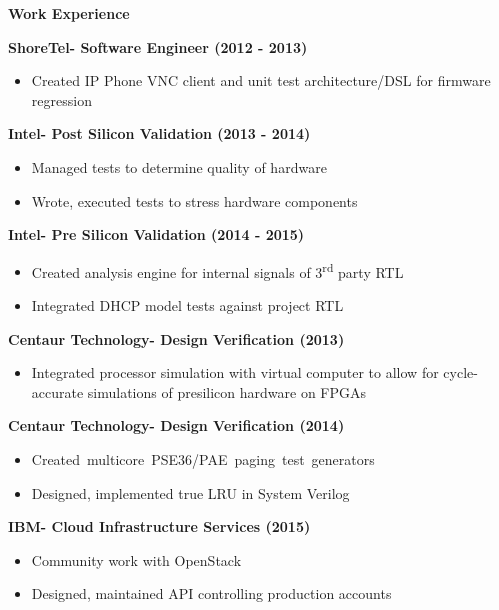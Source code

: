 \documentclass{report}
\begin{document}
\textbf{Work Experience} \\
\begin{paracol}{2}
  \textbf{ShoreTel- Software Engineer (2012 - 2013)}
  \begin{itemize}[label=$\circ$]
  \item Created IP Phone VNC client and unit test architecture/DSL for firmware
    regression
  \end{itemize}

  \textbf{Intel- Post Silicon Validation (2013 - 2014)}
  \begin{itemize}[label=$\circ$]
  \item Managed tests to determine quality of hardware
  \item Wrote, executed tests to stress hardware components
  \end{itemize}
  
  \textbf{Intel- Pre Silicon Validation (2014 - 2015)}
  \begin{itemize}[label=$\circ$]
  \item Created analysis engine for internal signals of 3\textsuperscript{rd} party RTL
  \item Integrated DHCP model tests against project RTL
  \end{itemize}

  \switchcolumn{}
  \textbf{Centaur Technology- Design Verification (2013)}
  \begin{itemize}[label=$\circ$]
  \item Integrated processor simulation with virtual computer to allow for
    cycle-accurate simulations of presilicon hardware on FPGAs
  \end{itemize}

  \textbf{Centaur Technology- Design Verification (2014)}
  \begin{itemize}[label=$\circ$]
  \item \mbox{Created multicore PSE36/PAE paging test generators}
  \item Designed, implemented true LRU in System Verilog
  \end{itemize}
  
  \textbf{IBM- Cloud Infrastructure Services (2015)}
  \begin{itemize}[label=$\circ$]
  \item Community work with OpenStack
  \item Designed, maintained API controlling production accounts
  \end{itemize}
\end{paracol}
\end{document}
